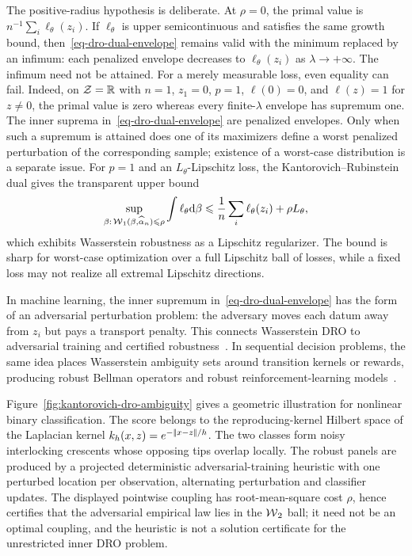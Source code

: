 The positive-radius hypothesis is deliberate. At $\rho=0$, the primal value is $n^{-1}\sum_i\ell_\theta(z_i)$. If $\ell_\theta$ is upper semicontinuous and satisfies the same growth bound, then~\eqref{eq-dro-dual-envelope} remains valid with the minimum replaced by an infimum: each penalized envelope decreases to $\ell_\theta(z_i)$ as $\lambda\to+\infty$. The infimum need not be attained. For a merely measurable loss, even equality can fail. Indeed, on $\mathcal{Z}=\mathbb{R}$ with $n=1$, $z_1=0$, $p=1$, $\ell(0)=0$, and $\ell(z)=1$ for $z\neq0$, the primal value is zero whereas every finite-$\lambda$ envelope has supremum one. The inner suprema in~\eqref{eq-dro-dual-envelope} are penalized envelopes. Only when such a supremum is attained does one of its maximizers define a worst penalized perturbation of the corresponding sample; existence of a worst-case distribution is a separate issue. For $p=1$ and an $L_\theta$-Lipschitz loss, the Kantorovich--Rubinstein dual gives the transparent upper bound
\[
	\sup_{\beta:\,\operatorname{\mathcal{W}}_1(\beta,\widehat{\alpha}_n)\leqslant \rho}
	\int \ell_\theta\mathrm{d}\beta
	\leqslant
	\frac1n\sum_i\ell_\theta(z_i)+\rho L_\theta,
\]
which exhibits Wasserstein robustness as a Lipschitz regularizer. The bound is sharp for worst-case optimization over a full Lipschitz ball of losses, while a fixed loss may not realize all extremal Lipschitz directions.

In machine learning, the inner supremum in~\eqref{eq-dro-dual-envelope} has the form of an adversarial perturbation problem: the adversary moves each datum away from $z_i$ but pays a transport penalty. This connects Wasserstein DRO to adversarial training and certified robustness~\cite{sinha2018certifying,NIPS2015_5745}. In sequential decision problems, the same idea places Wasserstein ambiguity sets around transition kernels or rewards, producing robust Bellman operators and robust reinforcement-learning models~\cite{xu2012distributionallyrobustmdp,yang2017convex}.

Figure~\ref{fig:kantorovich-dro-ambiguity} gives a geometric illustration for nonlinear binary classification. The score belongs to the reproducing-kernel Hilbert space of the Laplacian kernel $k_h(x,z)=e^{-|\!| x-z |\!|/h}$. The two classes form noisy interlocking crescents whose opposing tips overlap locally. The robust panels are produced by a projected deterministic adversarial-training heuristic with one perturbed location per observation, alternating perturbation and classifier updates. The displayed pointwise coupling has root-mean-square cost $\rho$, hence certifies that the adversarial empirical law lies in the $\operatorname{\mathcal{W}}_2$ ball; it need not be an optimal coupling, and the heuristic is not a solution certificate for the unrestricted inner DRO problem.

